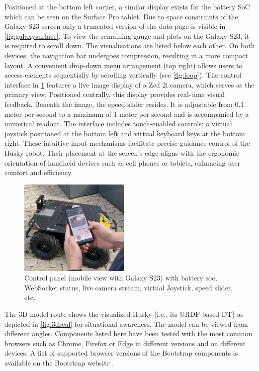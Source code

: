 \documentclass[conference]{IEEEtran}
\begin{document}
Positioned at the bottom left corner, a similar display exists for the battery SoC which can be seen on the Surface Pro tablet. Due to space constraints of the Galaxy S23 screen only a truncated version of the data page is visible in \cref{fig:galaxysurface}. To view the remaining gauge and plots on the Galaxy S23, it is required to scroll down. The visualizations are listed below each other.  
On both devices, the navigation bar undergoes compression, resulting in a more compact layout.
A convenient drop-down menu arrangement (top right) allows users to access elements sequentially by scrolling vertically (see \cref{fig:loop}).
The control interface in \cref{fig:galaxycontrol} features a live image display of a Zed 2i camera, which serves as the primary view. Positioned centrally, this display provides real-time visual feedback. Beneath the image, the speed slider resides. It is adjustable from 0.1 meter per second to a maximum of 1 meter per second and is accompanied by a numerical readout.
The interface includes touch-enabled controls: a virtual joystick positioned at the bottom left and virtual keyboard keys at the bottom right. These intuitive input mechanisms facilitate precise guidance control of the Husky robot. 
Their placement at the screen's edge aligns with the ergonomic orientation of handheld devices such as cell phones or tablets, enhancing user comfort and efficiency. 
\begin{figure}[b]
    \centerline{\includegraphics[width=5.3cm]{Pictures/galaxycontrol.jpg}}
    \caption{Control panel (mobile view with Galaxy S23) with battery soc, WebSocket status, live camera stream, virtual Joystick, speed slider, etc.}
    \label{fig:galaxycontrol}
\end{figure}
The 3D model route shows the visualized Husky (i.e., its URDF-based DT) as depicted in \cref{fig:3dreal} for situational awareness. The model can be viewed from different angles.
Components listed here have been tested with the most common browsers such as Chrome, Firefox or Edge in different versions and on different devices. A list of supported browser versions of the Bootstrap components is available on the Bootstrap website \cite{bsBrowsers}. 
\end{document}

